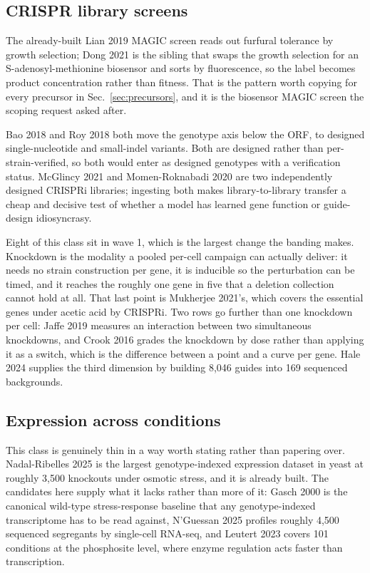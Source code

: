 \subsection{CRISPR library screens}

The already-built Lian 2019 MAGIC screen reads out furfural
tolerance by growth selection; Dong 2021 is the sibling that swaps the growth
selection for an S-adenosyl-methionine biosensor and sorts by fluorescence, so the label
becomes product concentration rather than fitness. That is the pattern worth copying for
every precursor in Sec.~\ref{sec:precursors}, and it is the biosensor MAGIC screen the
scoping request asked after.

Bao 2018 and Roy 2018 both move the genotype axis below the ORF, to
designed single-nucleotide and small-indel variants. Both are designed rather than
per-strain-verified, so both would enter as designed genotypes with a verification status.
McGlincy 2021 and Momen-Roknabadi 2020 are two independently designed
CRISPRi libraries; ingesting both makes library-to-library transfer a cheap and decisive
test of whether a model has learned gene function or guide-design idiosyncrasy.

Eight of this class sit in wave 1, which is the largest change the banding makes.
Knockdown is the modality a pooled per-cell campaign can actually deliver: it needs no
strain construction per gene, it is inducible so the perturbation can be timed, and it
reaches the roughly one gene in five that a deletion collection cannot hold at all. That
last point is Mukherjee 2021's, which covers the essential genes under acetic acid by
CRISPRi. Two rows go further than one knockdown per cell: Jaffe 2019 measures an
interaction between two simultaneous knockdowns, and Crook 2016 grades the knockdown by
dose rather than applying it as a switch, which is the difference between a point and a
curve per gene. Hale 2024 supplies the third dimension by building 8,046 guides into 169
sequenced backgrounds.

\subsection{Expression across conditions}

This class is genuinely thin in a way worth stating rather than papering over. Nadal-Ribelles 2025 is the largest genotype-indexed expression dataset in
yeast at roughly 3,500 knockouts under osmotic stress, and it is already built. The
candidates here supply what it lacks rather than more of it: Gasch 2000 is the
canonical wild-type stress-response baseline that any genotype-indexed transcriptome has to
be read against, N'Guessan 2025 profiles roughly 4,500 sequenced segregants by
single-cell RNA-seq, and Leutert 2023 covers 101 conditions at the phosphosite
level, where enzyme regulation acts faster than transcription.

